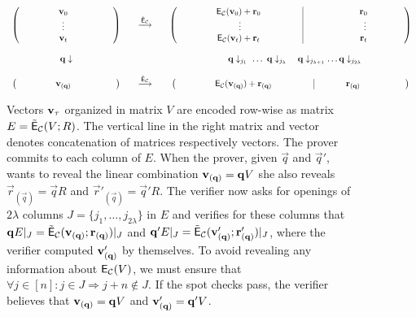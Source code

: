 \begin{figure}[!h]
\centering
\begin{minipage}[t]{15cm}
$$\begin{array}{ccc} 
\left(\begin{array}{ccc}\qquad &\quad\vect_0\quad \ &\ \qquad \\ &\quad \vdots\quad\ & \\ \qquad & \quad \vect_t \quad\ & \quad \end{array} \right) & \quad \overset{\ECC}{\longrightarrow} \quad & \left(\begin{array}{ccc|ccc} \qquad  & \quad \preECC(\vect_0)+\vec{r}_0 \quad \ & \qquad  &\qquad \qquad & \quad \vec{r}_0 \quad\ & \quad \\ 
&\vdots &&& \vdots & \\
\qquad  & \quad \preECC(\vect_t)+\vec{r}_t \quad \ & \qquad &\qquad \qquad & \quad \vec{r}_t \quad\ & \quad \ \\
\end{array}\right)\\
&\quad &\\
\vec{q}\downarrow && \quad\vec{q}\downarrow_{j_1} \,\,\dots\,\, \vec{q}\downarrow_{j_\lambda} \quad \vec{q}\downarrow_{j_{\lambda+1}} \dots \vec{q}\downarrow_{j_{2\lambda}}\\
&\quad & \\ 
\left(\begin{array}{ccc}\qquad &\quad \vect_{(\vec{q})} \quad \ & \ \qquad \end{array}\right) & \quad \overset{\ECC}{\longrightarrow} \quad & \left(\begin{array}{ccc|ccc} \qquad  & \quad \preECC(\vect_{(\vec{q})})+\vec{r}_{(\vec{q})} \quad\ & \qquad &\quad\, & \quad \vec{r}_{(\vec{q})} \quad\ & \qquad \ \end{array}\right)
\end{array}$$
\end{minipage}
\caption{Vectors ${\mathbf{v}}_\tau$ organized in matrix $V$ are encoded row-wise as matrix $E=\tilde{\mathsf{E}}_{\mathcal{C}}(V;R)$. The vertical line in the right matrix and vector denotes concatenation of matrices respectively vectors. The prover commits to each column of $E$. When the prover, given $\vec{q}$ and $\vec{q}'$, wants to reveal the linear combination ${\mathbf{v}}_{(\mathbf{q})}=\mathbf{q}V$ she also reveals $\vec{r}_{(\vec{q})}=\vec{q}R$ and $\vec{r}'_{(\vec{q})}=\vec{q}'R$. The verifier now asks for openings of $2\lambda$ columns $J=\{j_1,\dots,j_{2\lambda}\}$ in $E$ and verifies for these columns that $\mathbf{q}E|_J=\tilde{\mathsf{E}}_{\mathcal{C}}({\mathbf{v}}_{(\mathbf{q})};\mathbf{r}_{(\mathbf{q})})|_J$ and $\mathbf{q}'E|_J=\tilde{\mathsf{E}}_{\mathcal{C}}({\mathbf{v}}'_{(\mathbf{q})};\mathbf{r}'_{(\mathbf{q})})|_J$, where the verifier computed ${\mathbf{v}}'_{(\mathbf{q})}$ by themselves. To avoid revealing any information about $\mathsf{E}_{\mathcal{C}}(V)$, we must ensure that $\forall j\in [n]: j\in J\Rightarrow j+n\notin J$. If the spot checks pass, the verifier believes that ${\mathbf{v}}_{(\mathbf{q})}=\mathbf{q}V$ and ${\mathbf{v}}'_{(\mathbf{q})}=\mathbf{q}'V$.}\label{fig:spotcheck}
\end{figure}

